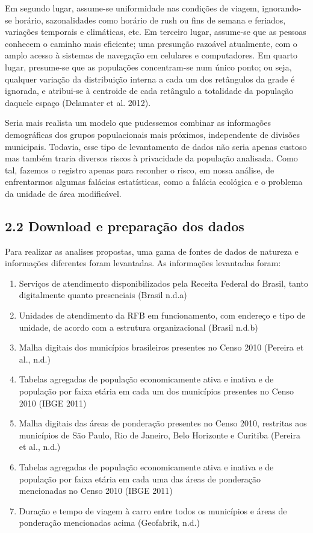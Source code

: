 \documentclass[]{article}
\providecommand{\tightlist}{%
  \setlength{\itemsep}{0pt}\setlength{\parskip}{0pt}}
\begin{document}
Em segundo lugar, assume-se uniformidade nas condições de viagem,
ignorando-se horário, sazonalidades como horário de rush ou fins de
semana e feriados, variações temporais e climáticas, etc. Em terceiro
lugar, assume-se que as pessoas conhecem o caminho mais eficiente; uma
presunção razoável atualmente, com o amplo acesso à sistemas de
navegação em celulares e computadores. Em quarto lugar, presume-se que
as populações concentram-se num único ponto; ou seja, qualquer variação
da distribuição interna a cada um dos retângulos da grade é ignorada, e
atribui-se à centroide de cada retângulo a totalidade da população
daquele espaço (Delamater et al. 2012).

Seria mais realista um modelo que pudessemos combinar as informações
demográficas dos grupos populacionais mais próximos, independente de
divisões municipais. Todavia, esse tipo de levantamento de dados não
seria apenas custoso mas também traria diversos riscos à privacidade da
população analisada. Como tal, fazemos o registro apenas para reconher o
risco, em nossa análise, de enfrentarmos algumas falácias estatísticas,
como a falácia ecológica e o problema da unidade de área modificável.

\hypertarget{download-e-preparacao-dos-dados}{%
\subsection{2.2 Download e preparação dos
dados}\label{download-e-preparacao-dos-dados}}

Para realizar as analises propostas, uma gama de fontes de dados de
natureza e informações diferentes foram levantadas. As informações
levantadas foram:

\begin{enumerate}
\def\labelenumi{\arabic{enumi}.}
\tightlist
\item
  Serviços de atendimento disponibilizados pela Receita Federal do
  Brasil, tanto digitalmente quanto presenciais (Brasil n.d.a)
\item
  Unidades de atendimento da RFB em funcionamento, com endereço e tipo
  de unidade, de acordo com a estrutura organizacional (Brasil n.d.b)
\item
  Malha digitais dos municípios brasileiros presentes no Censo 2010
  (Pereira et al., n.d.)
\item
  Tabelas agregadas de população economicamente ativa e inativa e de
  população por faixa etária em cada um dos municípios presentes no
  Censo 2010 (IBGE 2011)
\item
  Malha digitais das áreas de ponderação presentes no Censo 2010,
  restritas aos municípios de São Paulo, Rio de Janeiro, Belo Horizonte
  e Curitiba (Pereira et al., n.d.)
\item
  Tabelas agregadas de população economicamente ativa e inativa e de
  população por faixa etária em cada uma das áreas de ponderação
  mencionadas no Censo 2010 (IBGE 2011)
\item
  Duração e tempo de viagem à carro entre todos os municípios e áreas de
  ponderação mencionadas acima (Geofabrik, n.d.)
\end{enumerate}
\end{document}
